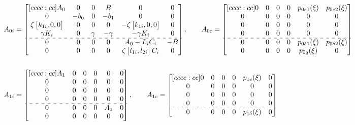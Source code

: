 \documentclass[main.tex]{subfiles}
\begin{document}
	\begin{align}
		A_{0i} &= 
		\begin{bmatrix}[cccc:cc]
		A_0 & 0 & 0 & B & 0 & 0\\
		0 & -b_0 & 0 & -b_1 & 0 & 0\\
		\zeta \begin{bmatrix}k_{1i} , 0 , 0\end{bmatrix} & 0 & 0 & 0 & -\zeta\begin{bmatrix}k_{1i} , 0 , 0\end{bmatrix} & 0\\
		\gamma K_i & 0 & \gamma & -\gamma & -\gamma K_i & 0\\ \hdashline
		0 & 0 & 0 & 0 & A_0 - L_iC_i & -B\\ 
		0 & 0 & 0 & 0 & \zeta \begin{bmatrix}l_{1i} , l_{2i}	\end{bmatrix} C_i & 0
		\end{bmatrix}, \qquad
		A_{0c} = 
		\begin{bmatrix}[cccc:cc]
		0 & 0 & 0 & 0 & p_{0e1}(\xi) & p_{0e2}(\xi) \\
		0 & 0 & 0 & 0 & 0 & 0 \\
		0 & 0 & 0 & 0 & 0 & 0 \\
		0 & 0 & 0 & 0 & 0 & 0 \\ \hdashline
		0 & 0 & 0 & 0 & p_{0\delta 1}(\xi) & p_{0\delta 2}(\xi) \\
		0 & 0 & 0 & 0 & p_{0q}(\xi) & 0
		\end{bmatrix} \nonumber\\
		\nonumber\\
		A_{1i} &= 
		\begin{bmatrix}[cccc:cc]
		A_1 & 0 & 0 & 0 & 0 & 0\\
		0 & 0 & 0 & 0 & 0 & 0\\
		0 & 0 & 0 & 0 & 0 & 0\\
		0 & 0 & 0 & 0 & 0 & 0\\ \hdashline
		0 & 0 & 0 & 0 & A_1 & 0\\ 
		0 & 0 & 0 & 0 & 0 & 0
		\end{bmatrix}, \qquad
		A_{1c} = \begin{bmatrix}[cccc:cc]	
		0 & 0 & 0 & 0 & p_{1e}(\xi) & 0\\
		0 & 0 & 0 & 0 & 0 & 0\\
		0 & 0 & 0 & 0 & 0 & 0\\
		0 & 0 & 0 & 0 & 0 & 0\\ \hdashline
		0 & 0 & 0 & 0 & p_{1\delta}(\xi) & 0\\

\end{bmatrix}
\end{align}
\end{document}
